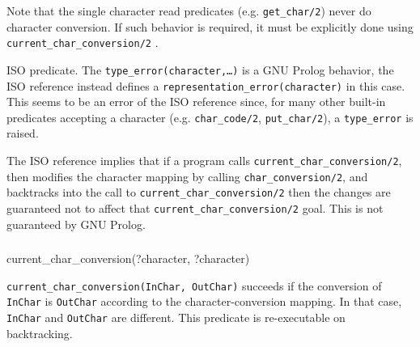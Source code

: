 Note that the single character read predicates (e.g. \texttt{get\_char/2})
never do character conversion. If such behavior is required, it must be
explicitly done using \texttt{current\_char\_conversion/2}
.

\begin{PlErrors}





\end{PlErrors}

\Portability

ISO predicate. The \texttt{type\_error(character,\ldots)} is a GNU Prolog
behavior, the ISO reference instead defines a
\texttt{representation\_error(character)} in this case. This seems to be an
error of the ISO reference since, for many other built-in predicates
accepting a character (e.g. \texttt{char\_code/2}, \texttt{put\_char/2}), a
\texttt{type\_error} is raised.

The ISO reference implies that if a program calls
\texttt{current\_char\_conversion/2}, then modifies the character mapping by
calling \texttt{char\_conversion/2}, and backtracks into the call to
\texttt{current\_char\_conversion/2} then the changes are guaranteed not to
affect that \texttt{current\_char\_conversion/2} goal. This is not guaranteed
by GNU Prolog.

\subsubsection{\label{current-char-conversion/2}}

\begin{TemplatesOneCol}
current\_char\_conversion(?character, ?character)

\end{TemplatesOneCol}

\Description

\texttt{current\_char\_conversion(InChar, OutChar)} succeeds if the
conversion of \texttt{InChar} is \texttt{OutChar} according to the
character-conversion mapping. In that case, \texttt{InChar} and
\texttt{OutChar} are different. This predicate is re-executable on
backtracking.

